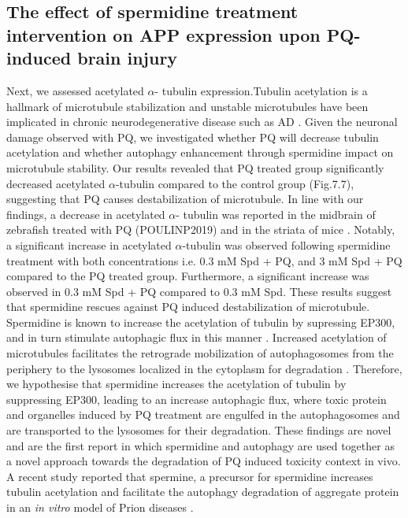 \subsection{The effect of spermidine treatment intervention on APP expression upon PQ-induced brain injury}
Next, we assessed acetylated $\alpha$- tubulin expression.Tubulin acetylation is a hallmark of microtubule stabilization and unstable microtubules have been implicated in chronic neurodegenerative disease such as AD \citep{Phadwal2018}. Given the neuronal damage observed with PQ, we investigated whether PQ will decrease tubulin acetylation and whether autophagy enhancement through spermidine impact on microtubule stability. Our results revealed that PQ treated group significantly decreased acetylated $\alpha$-tubulin compared to the control group (Fig.7.7), suggesting that PQ causes destabilization of microtubule. In line with our findings, a decrease in acetylated $\alpha$- tubulin was reported in the midbrain of zebrafish treated with PQ (POULINP2019) and in the striata of mice \citep{Wills2012}. Notably, a significant increase in acetylated $\alpha$-tubulin was observed following spermidine treatment with both concentrations i.e. 0.3 mM Spd + PQ, and 3 mM Spd + PQ compared to the PQ treated group. Furthermore, a significant increase was observed in 0.3 mM Spd + PQ compared to 0.3 mM Spd. These results suggest that spermidine rescues against PQ induced destabilization of microtubule. Spermidine is known to increase the acetylation of tubulin by supressing EP300, and in turn stimulate autophagic flux in this manner \citep{Madeo2018}. Increased acetylation of microtubules facilitates the retrograde mobilization of autophagosomes from the periphery to the lysosomes localized in the cytoplasm for degradation \citep{Phadwal2018,Xie2010}. Therefore, we hypothesise that spermidine increases the acetylation of tubulin by suppressing EP300, leading to an increase autophagic flux, where toxic protein and organelles induced by PQ treatment are engulfed in the autophagosomes and are transported to the lysosomes for their degradation. These findings are novel and are the first report in which spermidine and autophagy are used together as a novel approach towards the degradation of PQ induced toxicity context in vivo. A recent study reported that spermine, a precursor for spermidine increases tubulin acetylation and facilitate the autophagy degradation of aggregate protein in an \textit{in vitro} model of Prion diseases \citep{Phadwal2018}.

